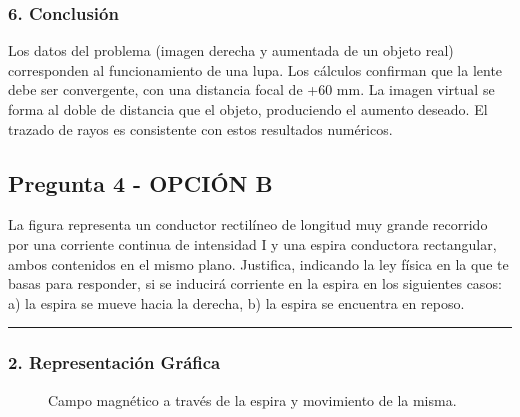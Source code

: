 \subsubsection*{6. Conclusión}
\begin{cajaconclusion}
Los datos del problema (imagen derecha y aumentada de un objeto real) corresponden al funcionamiento de una lupa. Los cálculos confirman que la lente debe ser convergente, con una distancia focal de +60 mm. La imagen virtual se forma al doble de distancia que el objeto, produciendo el aumento deseado. El trazado de rayos es consistente con estos resultados numéricos.
\end{cajaconclusion}

\newpage

\subsection{Pregunta 4 - OPCIÓN B}
\label{subsec:4B_2015_jun_ord}

\begin{cajaenunciado}
La figura representa un conductor rectilíneo de longitud muy grande recorrido por una corriente continua de intensidad I y una espira conductora rectangular, ambos contenidos en el mismo plano. Justifica, indicando la ley física en la que te basas para responder, si se inducirá corriente en la espira en los siguientes casos: a) la espira se mueve hacia la derecha, b) la espira se encuentra en reposo.
\end{cajaenunciado}
\hrule

\subsubsection*{2. Representación Gráfica}
\begin{figure}[H]
    \centering
    \caption{Campo magnético a través de la espira y movimiento de la misma.}
\end{figure}

